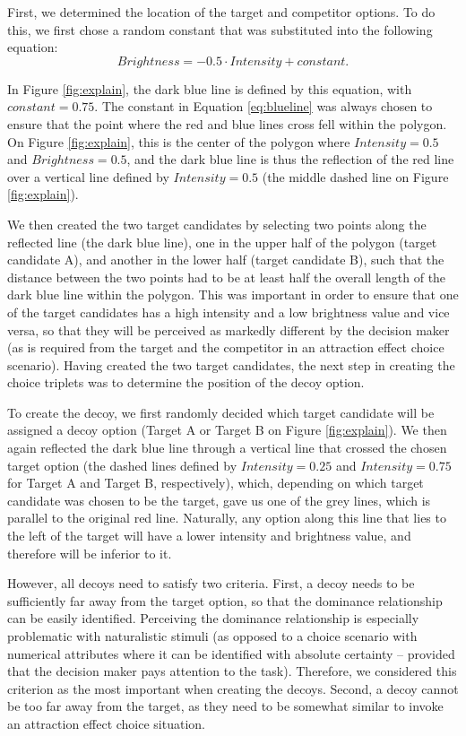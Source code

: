 \documentclass[11pt,a4paper]{article}
\begin{document}
 First, we determined the location of the target and competitor options. To do this, we first chose a random constant that was substituted into the following equation:
\begin{equation} \label{eq:blueline}
 Brightness = -0.5 \cdot Intensity + constant.
\end{equation}

In Figure \ref{fig:explain}, the dark blue line is defined by this equation, with $constant = 0.75$. The constant in Equation \ref{eq:blueline} was always chosen to ensure that the point where the red and blue lines cross fell within the polygon. On Figure \ref{fig:explain}, this is the center of the polygon where $Intensity = 0.5$ and $Brightness = 0.5$, and the dark blue line is thus the reflection of the red line over a vertical line defined by $Intensity = 0.5$ (the middle dashed line on Figure \ref{fig:explain}).




 We then created the two target candidates by selecting two points along the reflected line (the dark blue line), one in the upper half of the polygon (target candidate A), and another in the lower half (target candidate B), such that the distance between the two points had to be at least half the overall length of the dark blue line within the polygon. This was important in order to ensure that one of the target candidates has a high intensity and a low brightness value and vice versa, so that they will be perceived as markedly different by the decision maker (as is required from the target and the competitor in an attraction effect choice scenario). Having created the two target candidates, the next step in creating the choice triplets was to determine the position of the decoy option. 

To create the decoy, we first randomly decided which target candidate will be assigned a decoy option (Target A or Target B on Figure \ref{fig:explain}). We then again reflected the dark blue line through a vertical line that crossed the chosen target option (the dashed lines defined by $Intensity = 0.25$ and $Intensity = 0.75$ for Target A and Target B, respectively), which, depending on which target candidate was chosen to be the target, gave us one of the grey lines, which is parallel to the original red line. Naturally, any option along this line that lies to the left of the target will have a lower intensity and brightness value, and therefore will be inferior to it. 

However, all decoys need to satisfy two criteria. First, a decoy needs to be sufficiently far away from the target option, so that the dominance relationship can be easily identified. Perceiving the dominance relationship is especially problematic with naturalistic stimuli (as opposed to a choice scenario with numerical attributes where it can be identified with absolute certainty -- provided that the decision maker pays attention to the task). Therefore, we considered this criterion as the most important when creating the decoys. Second, a decoy cannot be too far away from the target, as they need to be somewhat similar to invoke an attraction effect choice situation.
\end{document}
